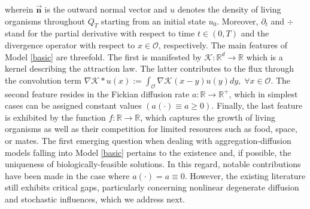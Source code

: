 \documentclass[10pt,number,preprint,times]{elsarticle}
\numberwithin{equation}{section} %
\begin{document}
wherein $\overrightarrow{\textbf{n}}$ is the outward normal vector and $u$ denotes the density of living organisms throughout $Q_T$ starting from an initial state $u_0$. Moreover, $\partial_t$ and $\div$ stand for the partial derivative with respect to time $t \in (0,T)$ and the divergence operator with respect to $x \in \mathcal{O}$, respectively. The main features of Model \eqref{basic} are threefold. The first is manifested by $\mathcal{K} : \mathbb{R}^d \longrightarrow \mathbb{R}$ which is a kernel describing the attraction law. The latter contributes to the flux through the convolution term $\nabla \mathcal{K} \ast u (x):= \displaystyle \int_\mathcal{O} \nabla \mathcal{K}(x-y)u(y)dy,\; \forall x \in \mathcal{O}.$ The second feature resides in the Fickian diffusion rate $a : \mathbb{R} \longrightarrow \mathbb{R}^+$, which in simplest cases can be assigned constant values $(a(\cdot)\equiv a \geq 0)$. Finally, the last feature is exhibited by the function $ f :  \mathbb{R} \longrightarrow \mathbb{R}$, which captures the growth of living organisms as well as their competition for limited resources such as food, space, or mates.
The first emerging question when dealing with aggregation-diffusion models falling into Model \eqref{basic} pertains to the existence and, if possible, the uniqueness of biologically-feasible solutions. In this regard, notable contributions have been made in the case where $a(\cdot)=a \equiv 0$. However, the existing literature still exhibits critical gaps, particularly concerning nonlinear degenerate diffusion and stochastic influences, which we address next.

\end{document}
